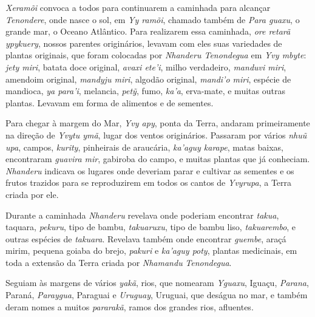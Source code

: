 
 


 

\emph{Xeramõi} convoca a todos para continuarem a caminhada para
alcançar \emph{Tenondere}, onde nasce o sol, em \emph{Yy ramõi}, chamado
também de \emph{Para guaxu}, o grande mar, o Oceano Atlântico. Para
realizarem essa caminhada, \emph{ore retarã ypykuery}, nossos parentes
originários, levavam com eles suas variedades de plantas originais, que
foram colocadas por \emph{Nhanderu Tenondegua} em \emph{Yvy mbyte}:
\emph{jety miri}, batata doce original, \emph{avaxi ete'i}, milho
verdadeiro, \emph{manduvi miri}, amendoim original, \emph{mandyju
miri}, algodão original, \emph{mandi'o miri}, espécie de mandioca,
\emph{ya para'i}, melancia, \emph{petỹ}, fumo, \emph{ka'a}, erva-mate, e
muitas outras plantas. Levavam em forma de alimentos e de sementes.

Para chegar à margem do Mar, \emph{Yvy apy}, ponta da Terra, andaram
primeiramente na direção de \emph{Yvytu ymã}, lugar dos ventos
originários. Passaram por vários \emph{nhuũ upa}, campos, \emph{kurity},
pinheirais de araucária, \emph{ka'aguy karape}, matas baixas,
encontraram \emph{guavira mir}, gabiroba do campo, e muitas plantas que
já conheciam. \emph{Nhanderu} indicava os lugares onde deveriam parar e
cultivar as sementes e os frutos trazidos para se reproduzirem em todos
os cantos de \emph{Yvyrupa}, a Terra criada por ele.

Durante a caminhada \emph{Nhanderu} revelava onde poderiam encontrar
\emph{takua}, taquara, \emph{pekuru}, tipo de bambu, \emph{takuaruxu},
tipo de bambu liso, \emph{takuarembo}, e outras espécies de
\emph{takuara}. Revelava também onde encontrar \emph{guembe}, araçá
mirim, pequena goiaba do brejo, \emph{pakuri} e \emph{ka'aguy poty},
plantas medicinais, em toda a extensão da Terra criada por
\emph{Nhamandu} \emph{Tenondegua}.


 

Seguiam às margens de vários \emph{yakã}, rios, que nomearam
\emph{Yguaxu}, Iguaçu, \emph{Parana}, Paraná, \emph{Paraygua}, Paraguai
e \emph{Uruguay}, Uruguai, que deságua no mar, e também deram nomes a
muitos \emph{pararakã}, ramos dos grandes rios, afluentes.

